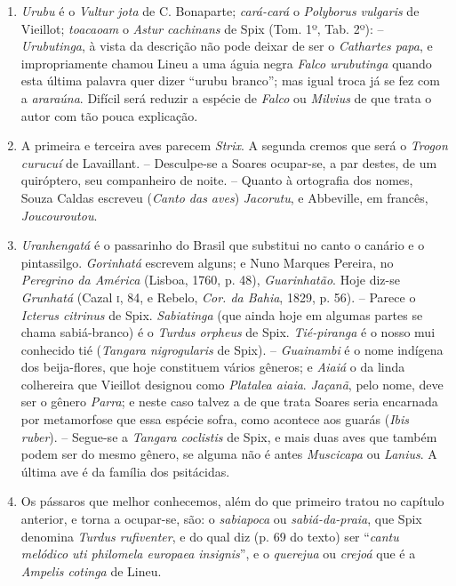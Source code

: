 \begin{enumerate}
\item  \textit{Urubu} é o \textit{Vultur jota} de C. Bonaparte; \textit{cará-cará} o \textit{Polyborus vulgaris} de Vieillot; 
\textit{toacaoam} o \textit{Astur cachinans} de Spix (Tom. 1º, Tab. 2º):
-- \textit{Urubutinga}, à vista da descrição não pode deixar de ser o \textit{Cathartes papa},
e impropriamente chamou Lineu a uma águia negra \textit{Falco urubutinga}
quando esta última palavra quer dizer ``urubu branco'';  mas igual troca
já se fez com a \textit{araraúna}. Difícil será reduzir a espécie de \textit{Falco} ou \textit{Milvius}
de que trata o autor com tão pouca explicação.

\item A primeira e terceira aves parecem \textit{Strix}. A segunda cremos que será o 
\textit{Trogon curucuí} de Lavaillant. -- Desculpe-se a Soares ocupar-se, a par destes, de um 
quiróptero, seu companheiro de noite. -- Quanto à ortografia dos nomes, Souza Caldas 
escreveu (\textit{Canto das aves}) \textit{Jacorutu}, e Abbeville, em francês, \textit{Joucouroutou}.

\item \textit{Uranhengatá} é o passarinho do Brasil que substitui no canto o canário e o 
pintassilgo. \textit{Gorinhatá} escrevem alguns; e Nuno Marques Pereira, no \textit{Peregrino da América} 
(Lisboa, 1760, p. 48), \textit{Guarinhatão}. Hoje diz-se \textit{Grunhatá} (Cazal \textsc{i}, 84, e 
Rebelo, \textit{Cor. da Bahia}, 1829, p. 56). -- Parece o \textit{Icterus citrinus} de Spix. \textit{Sabiatinga} 
(que ainda hoje em algumas partes se chama sabiá-branco) é o \textit{Turdus orpheus} de Spix. 
\textit{Tié-piranga} é o nosso mui conhecido tié  (\textit{Tangara nigrogularis} de Spix).
-- \textit{Guainambi} é o nome indígena dos beija-flores, que hoje 
constituem vários gêneros; e \textit{Aiaiá} o da linda colhereira que Vieillot designou como 
\textit{Platalea aiaia}. \textit{Jaçanã}, pelo nome, deve ser o gênero \textit{Parra}; e neste caso talvez a de que trata Soares 
seria encarnada por metamorfose que essa espécie sofra, como acontece aos guarás (\textit{Ibis ruber}). -- 
Segue-se a \textit{Tangara coclistis} de Spix, e mais duas aves que também podem ser do 
mesmo gênero, se alguma não é antes \textit{Muscicapa} ou \textit{Lanius}. A última ave é da família dos 
psitácidas.

\item Os pássaros que melhor conhecemos, além do que primeiro tratou no capítulo 
anterior, e torna a ocupar-se, são: o \textit{sabiapoca} ou \textit{sabiá-da-praia}, que Spix denomina  
\textit{Turdus rufiventer}, e do qual diz (p. 69 do texto) ser ``\textit{cantu melódico uti philomela 
europaea insignis}'',  e o \textit{querejua} ou \textit{crejoá} que é a \textit{Ampelis cotinga} de Lineu.


\end{enumerate}
